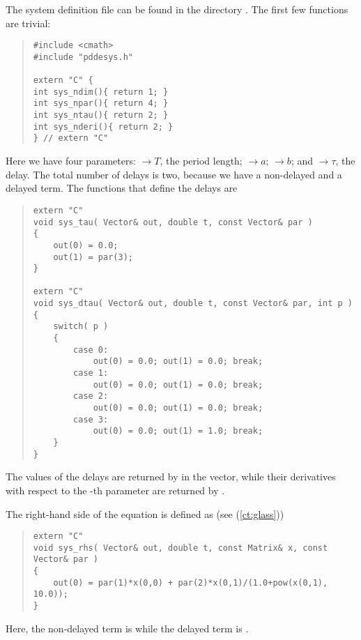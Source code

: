 \documentclass[10pt,a4paper]{ddedoc}
\begin{document}
The system definition file can be found in the directory
. The first few functions are trivial:
{ \small \begin{quote} \begin{lstlisting}[frame=single]
#include <cmath>
#include "pddesys.h"

extern "C" {
int sys_ndim(){ return 1; }
int sys_npar(){ return 4; }
int sys_ntau(){ return 2; }
int sys_nderi(){ return 2; }
} // extern "C"
\end{lstlisting} \end{quote} } \noindent
Here we have four parameters:
$\to T$, the period length;
$\to a$;
$\to b$; and
$\to \tau$, the delay.
The total number of delays is two, because we have a non-delayed and a delayed term.
The functions that define the delays are
{ \small \begin{quote} \begin{lstlisting}[frame=single]
extern "C"
void sys_tau( Vector& out, double t, const Vector& par ) 
{
	out(0) = 0.0;
	out(1) = par(3);
}

extern "C"
void sys_dtau( Vector& out, double t, const Vector& par, int p ) 
{
	switch( p )
	{
		case 0:
			out(0) = 0.0; out(1) = 0.0; break;
		case 1:
			out(0) = 0.0; out(1) = 0.0; break;
		case 2:
			out(0) = 0.0; out(1) = 0.0; break;
		case 3:
			out(0) = 0.0; out(1) = 1.0; break;
	}
}
\end{lstlisting} \end{quote} } \noindent
The values of the delays are returned by  in the  vector, while their derivatives with respect to the -th parameter are returned by .

The right-hand side of the equation is defined as (see (\ref{ct:glass}))
{ \small \begin{quote} \begin{lstlisting}[frame=single]
extern "C"
void sys_rhs( Vector& out, double t, const Matrix& x, const Vector& par )
{
	out(0) = par(1)*x(0,0) + par(2)*x(0,1)/(1.0+pow(x(0,1), 10.0));
}
\end{lstlisting} \end{quote} } \noindent
Here, the non-delayed term is  while the delayed term
is .
\end{document}

